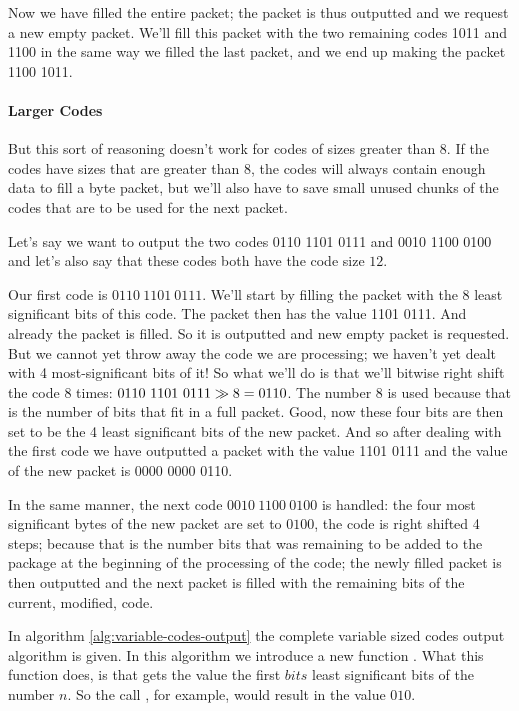\begin{refsection}
Now we have filled the entire packet; the packet is thus outputted and
we request a new empty packet. We'll fill this packet with the two
remaining codes 1011 and 1100 in the same way we filled the last
packet, and we end up making the packet  1100 1011.

\paragraph{Larger Codes}

But this sort of reasoning doesn't work for codes of sizes greater
than $8$. If the codes have sizes that are greater than $8$, the codes
will always contain enough data to fill a byte packet, but we'll also
have to save small unused chunks of the codes that are to be used for
the next packet.

Let's say we want to output the two codes 0110 1101 0111 and 0010 1100
0100 and let's also say that these codes both have the code size
$12$.

Our first code is $0110\ 1101\ 0111$. We'll start by filling the packet
with the 8 least significant bits of this code. The packet then has
the value 1101 0111. And already the packet is filled. So it is
outputted and new empty packet is requested. But we cannot yet throw
away the code we are processing; we haven't yet dealt with 4
most-significant bits of it! So what we'll do is that we'll bitwise
right shift the code 8 times: $0110\ 1101\ 0111 \ShiftRight 8 =
0110$. The number $8$ is used because that is the number of bits that
fit in a full packet. Good, now these four bits are then set to be the
4 least significant bits of the new packet. And so after dealing with
the first code we have outputted a packet with the value 1101 0111 and
the value of the new packet is 0000 0000 0110.

In the  same manner, the  next code $0010\  1100\ 0100$ is  handled: the
four most significant  bytes of the new packet are  set to $0100$, the
code is  right shifted 4 steps;  because that is the  number bits that
was  remaining to  be added  to the  package at  the beginning  of the
processing of the code; the  newly filled packet is then outputted and
the  next packet is  filled with  the remaining  bits of  the current,
modified, code.

In algorithm \ref{alg:variable-codes-output} the complete variable
sized codes output algorithm is given. In this algorithm we introduce
a new function . What
this function does, is that gets the value the first $bits$ least
significant bits of the number $n$. So the call
, for example, would result in the value
$010$.


\end{refsection}

